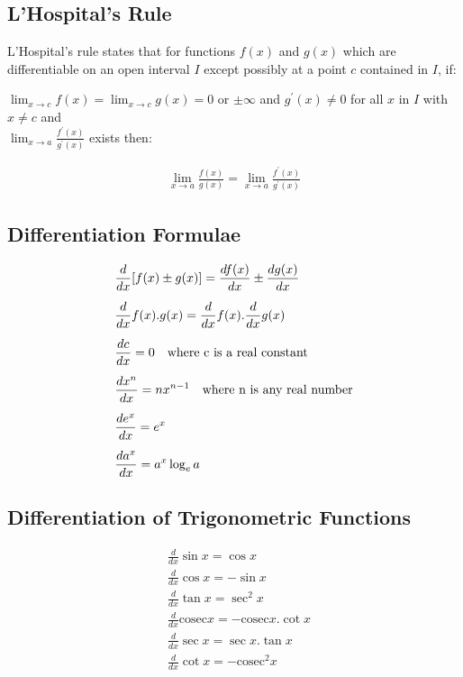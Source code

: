 \subsection{L'Hospital's Rule}
L'Hospital's rule states that for functions $f(x)$ and $g(x)$ which are differentiable on an open interval $I$ except possibly at a point $c$ contained in $I$, if:

\vspace{5mm}

\noindent
$ \lim_{x \to c} f(x) = \lim_{x \to c} g(x) = 0$ or $\pm \infty $ and $g^{'}(x)\neq 0$ for all $x$ in $I$ with $x \neq c$ and \\

\noindent
$\lim_{x \to a} \frac{f^{'}(x)}{g^{'}(x)}$ exists then:

\begin{tcolorbox}
\begin{center}
\begin{align*}
\lim_{x \to a} \frac{f(x)}{g(x)} = \lim_{x \to a} \frac{f^{'}(x)}{g^{'}(x)}
\end{align*}
\end{center}
\end{tcolorbox} 

\vspace{-3mm}

\subsection{Differentiation Formulae}
\begin{align*}
&\frac{d}{dx}[f(x) \pm g(x)] = \frac{df(x)}{dx} \pm\frac{dg(x)}{dx}\\[5pt]
&\frac{d}{dx}f(x).g(x) = \frac{d}{dx}f(x).\frac{d}{dx}g(x)\\[5pt]
&\frac{dc}{dx} = 0 \quad \text{where c is a real constant} \\[5pt]
&\frac{d x^n}{dx} = nx^{n-1} \quad \text{where n is any real number}\\[5pt]
\vspace{5mm}
&\frac{de^x}{dx} = e^x \\[5pt]
&\frac{da^x}{dx} = a^x\log_{e}a
\end{align*}

\subsection{Differentiation of Trigonometric Functions}
\begin{align*}
&\frac{d}{dx}\sin x = \cos x \\[5pt]
&\frac{d}{dx} \cos x = -\sin x \\[5pt]
&\frac{d}{dx} \tan x = \sec^{2} x \\[5pt]
&\frac{d}{dx} \mathrm{cosec} x = -\mathrm{cosec}x . \cot x \\[5pt]
&\frac{d}{dx}\sec x = \sec x. \tan x \\[5pt]
&\frac{d}{dx}\cot x = - \mathrm{cosec} ^2 x 
\end{align*}

